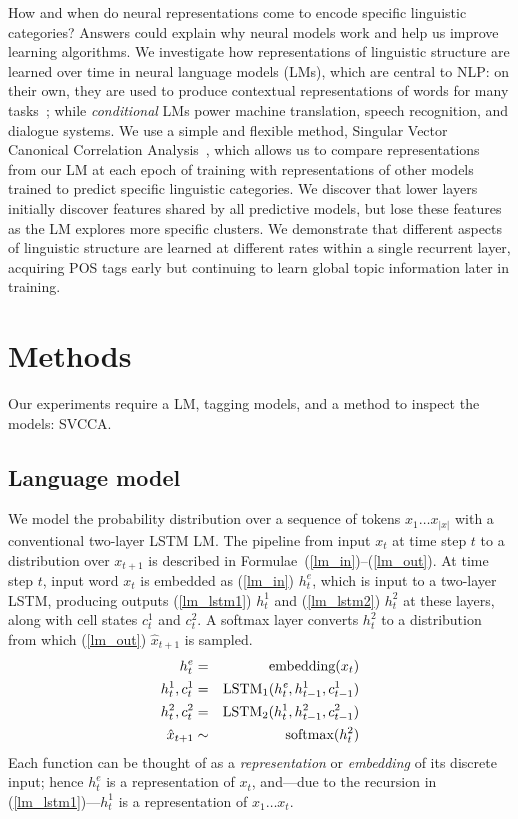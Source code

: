 How and when do neural representations come to encode specific linguistic categories? Answers could explain why neural models work and help us improve learning algorithms. 
We investigate how representations of linguistic structure are learned over time in neural language models (LMs), which are central to NLP: on their own, they are used to produce contextual representations of words for many tasks~\cite[e.g.]{peters2018deep}; while \emph{conditional} LMs power machine translation, speech recognition, and dialogue systems. We use a simple and flexible method, Singular Vector Canonical Correlation Analysis~\cite[SVCCA]{raghu_svcca:_2017}, which allows us to compare representations from our LM at each epoch of training with representations of other models trained to predict specific linguistic categories. We discover that lower layers initially discover features shared by all predictive models, but lose these features as the LM explores more specific clusters. We demonstrate that different aspects of linguistic structure are learned at different rates within a single recurrent layer, acquiring POS tags early but continuing to learn global topic information later in training.



\section{Methods}

Our experiments require a LM, tagging models, and a method to inspect the models: SVCCA.

\subsection{Language model}

We model the probability distribution over a sequence of tokens $x_1 \dots x_{|x|}$ with a conventional two-layer LSTM LM. The pipeline from input $x_t$ at time step $t$ to a distribution over $x_{t+1}$ is described in Formulae~(\ref{lm_in})--(\ref{lm_out}). At time step $t$, input word $x_t$ is embedded as (\ref{lm_in}) $h_t^{e}$, which is input to a two-layer LSTM, producing outputs (\ref{lm_lstm1}) $h_{t}^{1}$ and (\ref{lm_lstm2}) $h_{t}^{2}$ at these layers, along with cell states $c_{t}^{1}$ and $c_{t}^{2}$. A softmax layer converts $h_{t}^{2}$ to a distribution from which (\ref{lm_out}) $\hat{x}_{t+1}$ is sampled.
\begin{eqnarray}
h_t^{e} &=& \textrm{embedding}(x_{t})  \label{lm_in} \\
h_t^{1}, c_t^{1} &=& \textrm{LSTM}_{1}(h_t^{\emph{e}}, h_{t-1}^{1}, c_{t-1}^{1}) \label{lm_lstm1} \\
h_t^{2}, c_t^{2} &=& \textrm{LSTM}_2(h_t^{1}, h_{t-1}^{2}, c_{t-1}^{2})\label{lm_lstm2} \\
\hat{x}_{t+1} &\sim& \textrm{softmax}(h_{t}^{2}) \label{lm_out}
\end{eqnarray}
Each function can be thought of as a \emph{representation} or \emph{embedding} of its discrete input; hence $h_t^{e}$ is a representation of $x_t$, and---due to the recursion in (\ref{lm_lstm1})---$h_t^{1}$ is a representation of $x_1 \dots x_t$.

